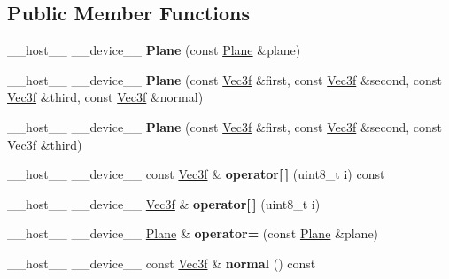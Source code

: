 \subsection*{Public Member Functions}
\begin{DoxyCompactItemize}
\item 
\+\_\+\+\_\+host\+\_\+\+\_\+ \+\_\+\+\_\+device\+\_\+\+\_\+ {\bfseries Plane} (const \hyperlink{class_plane}{Plane} \&plane)\hypertarget{class_plane_ad73917c92a73e36dcb1d716f79fdda04}{}\label{class_plane_ad73917c92a73e36dcb1d716f79fdda04}

\item 
\+\_\+\+\_\+host\+\_\+\+\_\+ \+\_\+\+\_\+device\+\_\+\+\_\+ {\bfseries Plane} (const \hyperlink{class_vec3}{Vec3f} \&first, const \hyperlink{class_vec3}{Vec3f} \&second, const \hyperlink{class_vec3}{Vec3f} \&third, const \hyperlink{class_vec3}{Vec3f} \&normal)\hypertarget{class_plane_adb0690a701aec7e890ffe616e05aa7b5}{}\label{class_plane_adb0690a701aec7e890ffe616e05aa7b5}

\item 
\+\_\+\+\_\+host\+\_\+\+\_\+ \+\_\+\+\_\+device\+\_\+\+\_\+ {\bfseries Plane} (const \hyperlink{class_vec3}{Vec3f} \&first, const \hyperlink{class_vec3}{Vec3f} \&second, const \hyperlink{class_vec3}{Vec3f} \&third)\hypertarget{class_plane_ab97bc9588363dbf0ed870ded0817d9b6}{}\label{class_plane_ab97bc9588363dbf0ed870ded0817d9b6}

\item 
\+\_\+\+\_\+host\+\_\+\+\_\+ \+\_\+\+\_\+device\+\_\+\+\_\+ const \hyperlink{class_vec3}{Vec3f} \& {\bfseries operator\mbox{[}$\,$\mbox{]}} (uint8\+\_\+t i) const\hypertarget{class_plane_ad0d581daf542b982afdfdbe7dc12d5f0}{}\label{class_plane_ad0d581daf542b982afdfdbe7dc12d5f0}

\item 
\+\_\+\+\_\+host\+\_\+\+\_\+ \+\_\+\+\_\+device\+\_\+\+\_\+ \hyperlink{class_vec3}{Vec3f} \& {\bfseries operator\mbox{[}$\,$\mbox{]}} (uint8\+\_\+t i)\hypertarget{class_plane_ae0980a97158717c8a0d543aecd8a0eca}{}\label{class_plane_ae0980a97158717c8a0d543aecd8a0eca}

\item 
\+\_\+\+\_\+host\+\_\+\+\_\+ \+\_\+\+\_\+device\+\_\+\+\_\+ \hyperlink{class_plane}{Plane} \& {\bfseries operator=} (const \hyperlink{class_plane}{Plane} \&plane)\hypertarget{class_plane_a028c720b343f768f876c531a67e64496}{}\label{class_plane_a028c720b343f768f876c531a67e64496}

\item 
\+\_\+\+\_\+host\+\_\+\+\_\+ \+\_\+\+\_\+device\+\_\+\+\_\+ const \hyperlink{class_vec3}{Vec3f} \& {\bfseries normal} () const\hypertarget{class_plane_a9132cbc2fc014812966ac919bb96f6bf}{}\label{class_plane_a9132cbc2fc014812966ac919bb96f6bf}


\end{DoxyCompactItemize}

